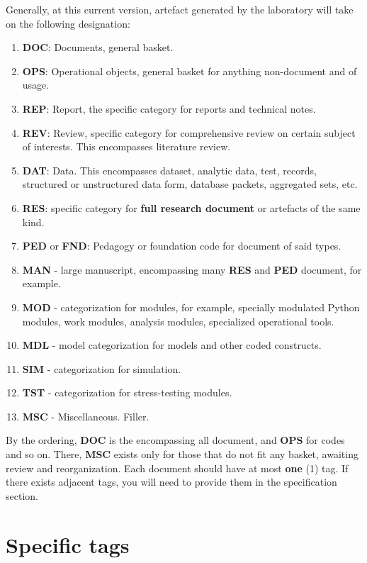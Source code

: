 \documentclass[9pt,a4paper]{article}
\begin{document}
Generally, at this current version, artefact generated by the laboratory will take on the following designation:
\begin{enumerate}
    \item \textbf{DOC}: Documents, general basket. 
    \item \textbf{OPS}: Operational objects, general basket for anything non-document and of usage. 
    \item \textbf{REP}: Report, the specific category for reports and technical notes. 
    \item \textbf{REV}: Review, specific category for comprehensive review on certain subject of interests. This encompasses literature review. 
    \item \textbf{DAT}: Data. This encompasses dataset, analytic data, test, records, structured or unstructured data form, database packets, aggregated sets, etc. 
    \item \textbf{RES}: specific category for \textbf{full research document} or artefacts of the same kind.
    \item \textbf{PED} or \textbf{FND}: Pedagogy or foundation code for document of said types. 
    \item \textbf{MAN} - large manuscript, encompassing many \textbf{RES} and \textbf{PED} document, for example. 
    \item \textbf{MOD} - categorization for modules, for example, specially modulated Python modules, work modules, analysis modules, specialized operational tools. 
    \item \textbf{MDL} - model categorization for models and other coded constructs. 
    \item \textbf{SIM} - categorization for simulation. 
    \item \textbf{TST} - categorization for stress-testing modules. 
    \item \textbf{MSC} - Miscellaneous. Filler.
\end{enumerate}

By the ordering, \textbf{DOC} is the encompassing all document, and \textbf{OPS} for codes and so on. There, \textbf{MSC} exists only for those that do not fit any basket, awaiting review and reorganization. Each document should have at most \textbf{one} (1) tag. If there exists adjacent tags, you will need to provide them in the specification section. 

\section{Specific tags}
\end{document}
